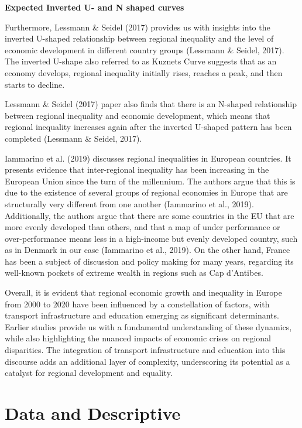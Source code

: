 \documentclass[
  a4paper,
  DIV=11,
  numbers=noendperiod]{scrartcl}
\begin{document}
\textbf{Expected Inverted U- and N shaped curves}

Furthermore, Lessmann \& Seidel (2017) provides us with insights into
the inverted U-shaped relationship between regional inequality and the
level of economic development in different country groups (Lessmann \&
Seidel, 2017). The inverted U-shape also referred to as Kuznets Curve
suggests that as an economy develops, regional inequality initially
rises, reaches a peak, and then starts to decline.

Lessmann \& Seidel (2017) paper also finds that there is an N-shaped
relationship between regional inequality and economic development, which
means that regional inequality increases again after the inverted
U-shaped pattern has been completed (Lessmann \& Seidel, 2017).

Iammarino et al. (2019) discusses regional inequalities in European
countries. It presents evidence that inter-regional inequality has been
increasing in the European Union since the turn of the millennium. The
authors argue that this is due to the existence of several groups of
regional economies in Europe that are structurally very different from
one another (Iammarino et al., 2019). Additionally, the authors argue
that there are some countries in the EU that are more evenly developed
than others, and that a map of under performance or over-performance
means less in a high-income but evenly developed country, such as in
Denmark in our case (Iammarino et al., 2019). On the other hand, France
has been a subject of discussion and policy making for many years,
regarding its well-known pockets of extreme wealth in regions such as
Cap d'Antibes.

Overall, it is evident that regional economic growth and inequality in
Europe from 2000 to 2020 have been influenced by a constellation of
factors, with transport infrastructure and education emerging as
significant determinants. Earlier studies provide us with a fundamental
understanding of these dynamics, while also highlighting the nuanced
impacts of economic crises on regional disparities. The integration of
transport infrastructure and education into this discourse adds an
additional layer of complexity, underscoring its potential as a catalyst
for regional development and equality.

\hypertarget{data-and-descriptive}{%
\section{Data and Descriptive}\label{data-and-descriptive}}
\end{document}

